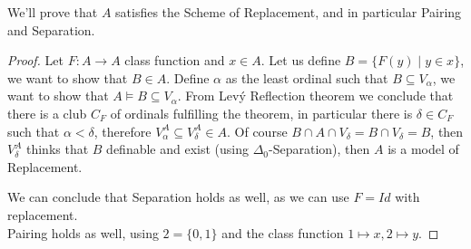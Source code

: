 \subquestion{}
We'll prove that $A$ satisfies the Scheme of Replacement, and in particular Pairing and Separation.
\begin{proof}
	Let $F : A \to A$ class function and $x \in A$.
	Let us define $B = \{ F(y) \mid y \in x \}$, we want to show that $B \in A$.
	Define $\alpha$ as the least ordinal such that $B \subseteq V_\alpha$, we want to show that $A \models B \subseteq V_\alpha$.
	From Lev\'y Reflection theorem we conclude that there is a club $C_F$ of ordinals fulfilling the theorem, in particular there is $\delta \in C_F$ such that $\alpha < \delta$, therefore $V_\alpha^A \subseteq V_\delta^A \in A$.
	Of course $B \cap A \cap V_\delta = B \cap V_\delta = B$, then $V_\delta^A$ thinks that $B$ definable and exist (using $\Delta_0$-Separation), then $A$ is a model of Replacement.

	We can conclude that Separation holds as well, as we can use $F = Id$ with replacement. \\
	Pairing holds as well, using $2 = \{0, 1\}$ and the class function $1 \mapsto x, 2 \mapsto y$.
\end{proof}


